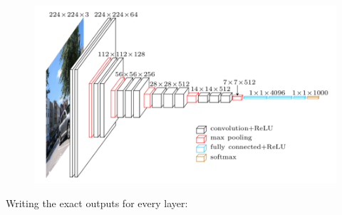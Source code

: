 \documentclass[a4paper]{iacas}
\begin{document}
\vskip 0.1in
\begin{figure}
	\includegraphics[scale=0.6]{imgs/vgg_arc.PNG}
\end{figure}
\vskip 0.1in

Writing the exact outputs for every layer:
\end{document}
